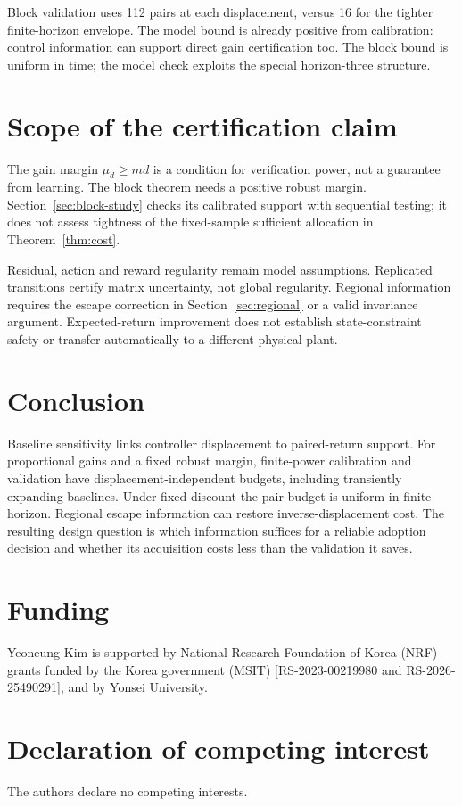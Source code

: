 \documentclass[twocolumn,nameyear]{autart}
\begin{document}
Block validation uses 112 pairs at each displacement, versus 16 for
the tighter finite-horizon envelope. The model bound is already positive
from calibration: control information can support direct gain
certification too. The block bound is uniform in time; the model check
exploits the special horizon-three structure.

\section{Scope of the certification claim}
The gain margin $\mu_d\ge md$ is a condition for verification power,
not a guarantee from learning. The block theorem needs a positive
robust margin. Section~\ref{sec:block-study} checks its calibrated
support with sequential testing; it does not assess tightness of the
fixed-sample sufficient allocation in Theorem~\ref{thm:cost}.

Residual, action and reward regularity remain model assumptions.
Replicated transitions certify matrix uncertainty, not global regularity.
Regional information requires the escape correction in
Section~\ref{sec:regional} or a valid invariance argument.
Expected-return improvement does not establish state-constraint safety
or transfer automatically to a different physical plant.

\section{Conclusion}
Baseline sensitivity links controller displacement to paired-return
support. For proportional gains and a fixed robust margin, finite-power
calibration and validation have displacement-independent budgets,
including transiently expanding baselines. Under fixed discount the pair
budget is uniform in finite horizon. Regional escape information can
restore inverse-displacement cost. The resulting design question is
which information suffices for a reliable adoption decision and whether
its acquisition costs less than the validation it saves.

\section*{Funding}
Yeoneung Kim is supported by National Research Foundation of Korea (NRF)
grants funded by the Korea government (MSIT)
[RS-2023-00219980 and RS-2026-25490291], and by Yonsei University.
\section*{Declaration of competing interest}
The authors declare no competing interests.
\end{document}
